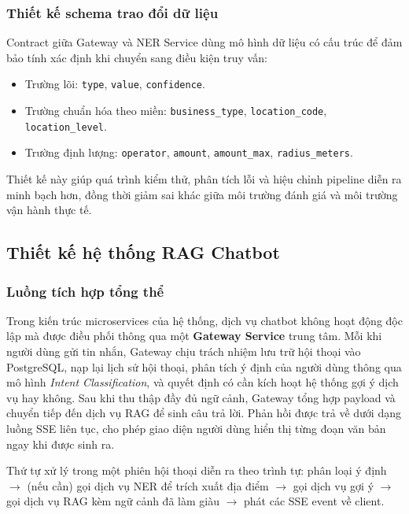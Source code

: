 \subsubsection{Thiết kế schema trao đổi dữ liệu}

Contract giữa Gateway và NER Service dùng mô hình dữ liệu có cấu trúc để đảm bảo tính xác định khi chuyển sang điều kiện truy vấn:
\begin{itemize}
    \item Trường lõi: \texttt{type}, \texttt{value}, \texttt{confidence}.
    \item Trường chuẩn hóa theo miền: \texttt{business\_type}, \texttt{location\_code}, \texttt{location\_level}.
    \item Trường định lượng: \texttt{operator}, \texttt{amount}, \texttt{amount\_max}, \texttt{radius\_meters}.
\end{itemize}

Thiết kế này giúp quá trình kiểm thử, phân tích lỗi và hiệu chỉnh pipeline diễn ra minh bạch hơn, đồng thời giảm sai khác giữa môi trường đánh giá và môi trường vận hành thực tế.

\subsection{Thiết kế hệ thống RAG Chatbot}

\subsubsection{Luồng tích hợp tổng thể}

Trong kiến trúc microservices của hệ thống, dịch vụ chatbot không hoạt động độc lập mà được điều phối thông qua một \textbf{Gateway Service} trung tâm. Mỗi khi người dùng gửi tin nhắn, Gateway chịu trách nhiệm lưu trữ hội thoại vào PostgreSQL, nạp lại lịch sử hội thoại, phân tích ý định của người dùng thông qua mô hình \textit{Intent Classification}, và quyết định có cần kích hoạt hệ thống gợi ý dịch vụ hay không. Sau khi thu thập đầy đủ ngữ cảnh, Gateway tổng hợp payload và chuyển tiếp đến dịch vụ RAG để sinh câu trả lời. Phản hồi được trả về dưới dạng luồng SSE liên tục, cho phép giao diện người dùng hiển thị từng đoạn văn bản ngay khi được sinh ra.

Thứ tự xử lý trong một phiên hội thoại diễn ra theo trình tự: phân loại ý định $\rightarrow$ (nếu cần) gọi dịch vụ NER để trích xuất địa điểm $\rightarrow$ gọi dịch vụ gợi ý $\rightarrow$ gọi dịch vụ RAG kèm ngữ cảnh đã làm giàu $\rightarrow$ phát các SSE event về client.


